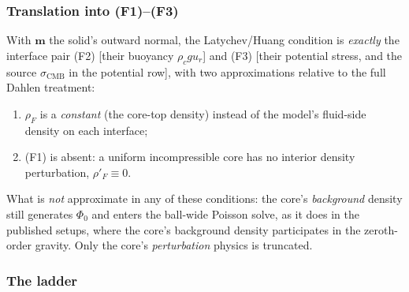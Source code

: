 \documentclass[11pt]{article}
\numberwithin{equation}{section}
\theoremstyle{remark}
\newcommand{\vm}{\mathbf{m}}
\begin{document}
\subsubsection{Translation into (F1)--(F3)}

With $\vm$ the solid's outward normal, the Latychev/Huang condition is
\emph{exactly} the interface pair (F2) [their buoyancy $\rho_c g u_r$] and
(F3) [their potential stress, and the source $\sigma_{\mathrm{CMB}}$ in the
potential row], with two approximations relative to the full Dahlen
treatment:
\begin{enumerate}
\item[(i)] $\rho_F$ is a \emph{constant} (the core-top density) instead of
  the model's fluid-side density on each interface;
\item[(ii)] (F1) is absent: a uniform incompressible core has no interior
  density perturbation, $\rho'_F \equiv 0$.
\end{enumerate}
What is \emph{not} approximate in any of these conditions: the core's
\emph{background} density still generates $\Phi_0$ and enters the
ball-wide Poisson solve, as it does in the published setups, where the
core's background density participates in the zeroth-order gravity. Only
the core's \emph{perturbation} physics is truncated.

\subsubsection{The ladder}
\end{document}
